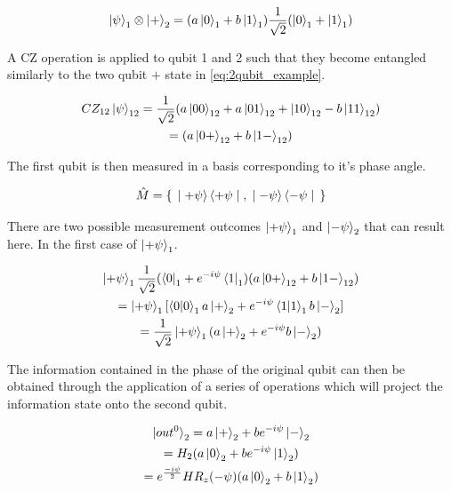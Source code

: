 \begin{equation}
\ket{\psi}_{1} \otimes \ket{+}_{2} = (a \ket{0}_{1} + b \ket{1}_{1}) \frac{1}{\sqrt{2}} (\ket{0}_{1} + \ket{1}_{1})
\end{equation}

A CZ operation is applied to qubit 1 and 2 such that they become entangled similarly to the two qubit $+$ state in \eqref{eq:2qubit_example}.

\begin{multline}
CZ_{12}\ket{\psi}_{12} = \frac{1}{\sqrt{2}} (a \ket{00}_{12} + a \ket{01}_{12} + \ket{10}_{12} - b \ket{11}_{12}) \\
= (a \ket{0+}_{12} + b \ket{1-}_{12}) \\
\end{multline}

The first qubit is then measured in a basis corresponding to it's phase angle. 

\begin{equation}
\hat{M} = \set{ \ket{+ \psi} \bra{+ \psi}, \ket{- \psi} \bra{- \psi}}
\end{equation}

There are two possible measurement outcomes $\ket{+ \psi}_{1}$ and $\ket{- \psi}_{2}$ that can result here. In the first case of $\ket{+ \psi}_{1}$.

\begin{multline}
\ket{+ \psi}_{1} \frac{1}{\sqrt{2}} (\bra{0}_{1} + e^{-i \psi} \bra{1}_{1}) (a \ket{0+}_{12} + b \ket{1-}_{12}) \\
= \ket{+ \psi}_{1} [\braket{0|0}_{1} a \ket{+}_{2} + e^{-i \psi} \braket{1|1}_{1} b \ket{-}_{2}] \\
= \frac{1}{\sqrt{2}} \ket{+ \psi}_{1} (a \ket{+}_{2} + e^{-i \psi} b \ket{-}_{2}) \\
\end{multline}

The information contained in the phase of the original qubit can then be obtained through the application of a series of operations which will project the information state onto the second qubit.

\begin{multline}
\ket{out^{0}}_{2} = a \ket{+}_{2} + b e^{-i \psi} \ket{-}_{2} \\
= H_{2} (a \ket{0}_{2} + b e^{-i \psi} \ket{1}_{2}) \\
= e^{\frac{-i \psi}{2}} H R_{z} (-\psi) (a \ket{0}_{2} + b \ket{1}_{2}) \\
\end{multline}

